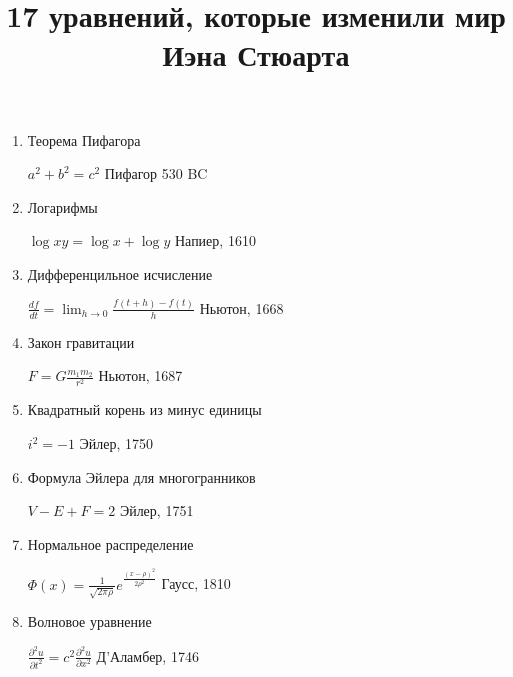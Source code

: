 \documentclass[12pt]{article}
\date{}
\title{\bf 17 уравнений, которые изменили мир \\Иэна Стюарта\\}
\begin{document}
 
\begin{k} 
\maketitle
\begin{enumerate}
 \item Теорема Пифагора \hfill \begin{minipage}[t]{100mm} $a^2+b^2 = c^2$ \hfill Пифагор 530 BC \end{minipage}
 \item Логарифмы  \hfill \begin{minipage}[t]{100mm} $\log xy = \log x+\log y$ \hfill Напиер, 1610 \end{minipage} 
 \item Дифференцильное исчисление \hfill \begin{minipage}[t]{100mm} $\frac{df}{dt} = \lim_{h \to 0}\frac {f(t+h)-f(t)}{h} $ \hfill Ньютон, 1668 \end{minipage}
 \item   Закон гравитации \hfill \begin{minipage}[t]{100mm} $F = G \frac{m_1m_2}{r^2}$ \hfill Ньютон, 1687 \end{minipage}
 \item \noindent
  \begin{minipage}[t]{45mm} Квадратный корень из минус единицы \end{minipage}
  \hfill
  \begin{minipage}[t]{100mm}  $i^2 = -1$ \hfill Эйлер, 1750 \end{minipage}
 \item \noindent
  \begin{minipage}[t]{45mm} Формула Эйлера для многогранников \end{minipage}
  \hfill 
  \begin{minipage}[t]{100mm}  $V - E + F = 2$ \hfill Эйлер, 1751 \end{minipage}
 \item Нормальное распределение \hfill \begin{minipage}[t]{100mm} $\Phi(x) = \frac{1}{\sqrt{2\pi\rho}}e^\frac{(x-\rho)^2}{2\rho^2}$ \hfill Гаусс, 1810 \end{minipage}
 \item Волновое уравнение \hfill \begin{minipage}[t]{100mm} $\frac{\partial^2 u}{\partial t^2} = c^2 \frac{\partial^2 u}{\partial x^2}$ \hfill Д'Аламбер, 1746 \end{minipage}

\end{enumerate}
\end{k}
\end{document}
